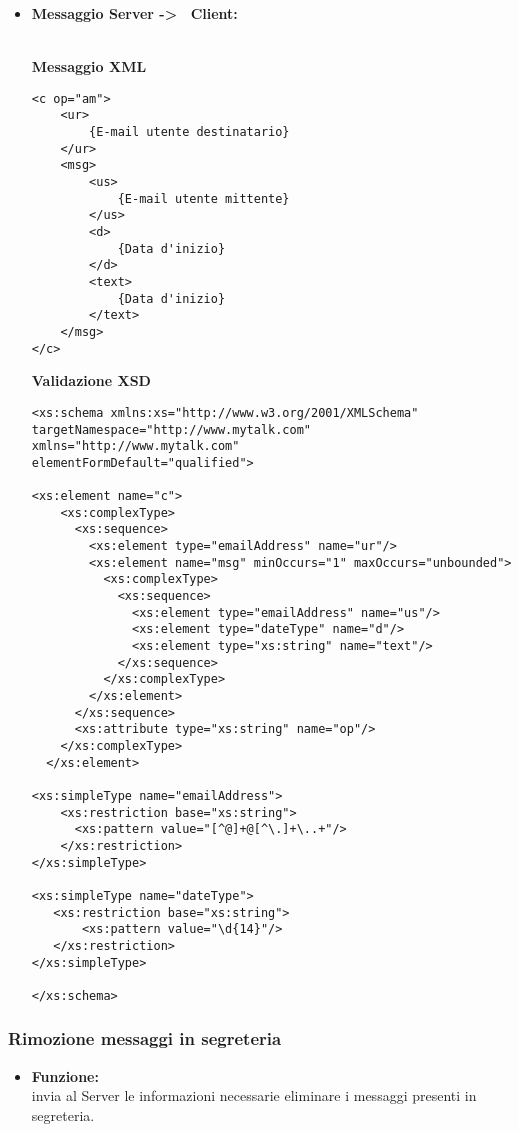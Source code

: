 {{\begin{itemize}
{\begin{lstlisting}
<xs:simpleType name="emailAddress"> 
    <xs:restriction base="xs:string"> 
      <xs:pattern value="[^@]+@[^\.]+\..+"/> 
    </xs:restriction> 
</xs:simpleType>

<xs:simpleType name="dateType">
   <xs:restriction base="xs:string">
       <xs:pattern value="\d{14}"/>
   </xs:restriction>
</xs:simpleType>

</xs:schema>
				\end{lstlisting}
				}
				
				\item[] \textbf{Messaggio Server -\textgreater~ Client:}{\\
				\textbf{Messaggio XML}\\
				\begin{lstlisting}
<c op="am">
	<ur>
		{E-mail utente destinatario}
	</ur>
	<msg>
		<us>
			{E-mail utente mittente}
		</us>
		<d>
			{Data d'inizio}
		</d>
		<text>
			{Data d'inizio}
		</text>
	</msg>
</c>
				\end{lstlisting}
				\textbf{Validazione XSD}\\
				\begin{lstlisting}
<xs:schema xmlns:xs="http://www.w3.org/2001/XMLSchema"
targetNamespace="http://www.mytalk.com"
xmlns="http://www.mytalk.com"
elementFormDefault="qualified">

<xs:element name="c">
    <xs:complexType>
      <xs:sequence>
        <xs:element type="emailAddress" name="ur"/>
        <xs:element name="msg" minOccurs="1" maxOccurs="unbounded">
          <xs:complexType>
            <xs:sequence>
              <xs:element type="emailAddress" name="us"/>
              <xs:element type="dateType" name="d"/>
              <xs:element type="xs:string" name="text"/>
            </xs:sequence>
          </xs:complexType>
        </xs:element>
      </xs:sequence>
      <xs:attribute type="xs:string" name="op"/>
    </xs:complexType>
  </xs:element>

<xs:simpleType name="emailAddress"> 
    <xs:restriction base="xs:string"> 
      <xs:pattern value="[^@]+@[^\.]+\..+"/> 
    </xs:restriction> 
</xs:simpleType>

<xs:simpleType name="dateType">
   <xs:restriction base="xs:string">
       <xs:pattern value="\d{14}"/>
   </xs:restriction>
</xs:simpleType>

</xs:schema>
				\end{lstlisting}
				}
		\end{itemize}
	}%
	
		\subsubsection{Rimozione messaggi in segreteria}{
	\label{opAMD}
		\begin{itemize}
			\item[] \textbf{Funzione:}{\\
				invia al Server le informazioni necessarie eliminare i messaggi presenti in segreteria.
				}
			

\end{itemize}}}
